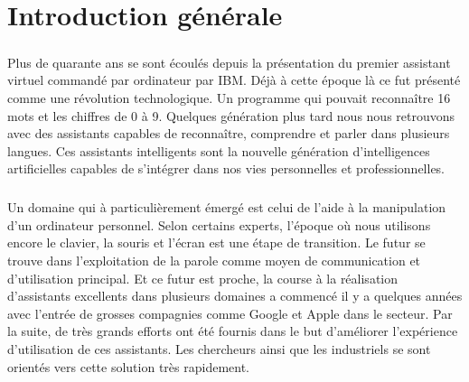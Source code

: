 \chapter*{Introduction générale}
\paragraph{}



\paragraph{}
Plus de quarante ans se sont écoulés depuis la présentation du premier assistant virtuel commandé par ordinateur par IBM. Déjà à cette époque là ce fut présenté comme une révolution technologique. Un programme qui pouvait reconnaître 16 mots et les chiffres de 0 à 9. Quelques génération plus tard nous nous retrouvons avec des assistants capables de reconnaître, comprendre et parler dans plusieurs langues. Ces assistants intelligents sont la nouvelle génération d'intelligences artificielles capables de s'intégrer dans nos vies personnelles et professionnelles. 

\paragraph{}
Un domaine qui à particulièrement émergé est celui de l'aide à la manipulation d'un ordinateur personnel. Selon certains experts, l'époque où nous utilisons encore le clavier, la souris et l'écran est une étape de transition. Le futur se trouve dans l'exploitation de la parole comme moyen de communication et d'utilisation principal. Et ce futur est proche, la course à la réalisation d'assistants excellents dans plusieurs domaines a commencé il y a quelques années avec l'entrée de grosses compagnies comme Google et Apple dans le secteur. Par la suite, de très grands efforts ont été fournis dans le but d'améliorer l'expérience d'utilisation de ces assistants. Les chercheurs ainsi que les industriels se sont orientés vers cette solution très rapidement.

